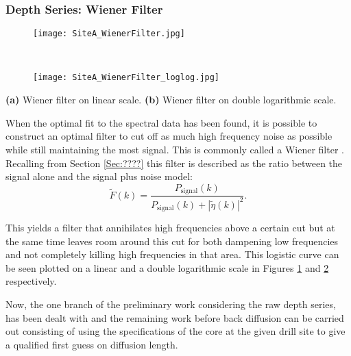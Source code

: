 \documentclass[../../CompleteThesis/Complete_1stDraft.tex]{subfiles}
\begin{document}
\subsubsection[Wiener Filter]{Depth Series: Wiener Filter}
\begin{marginfigure}
	\centering
	\begin{subfigure}{\marginparwidth}
		\centering
		\texttt{[image: SiteA\_WienerFilter.jpg]}
		\caption{\footnotesize}
		\label{fig:SiteA_WienerFilter}
	\end{subfigure}\\[1ex]
	
	\begin{subfigure}{\marginparwidth}
		\centering
		\texttt{[image: SiteA\_WienerFilter\_loglog.jpg]}
		\caption{\footnotesize}
		\label{fig:SiteA_WienerFilter_loglog}
	\end{subfigure}
	\caption[Wiener filter]{\footnotesize\textbf{(a)} Wiener filter on linear scale. \textbf{(b)} Wiener filter on double logarithmic scale.}
	\label{fig:SiteA_WienerFilters}
\end{marginfigure}
When the optimal fit to the spectral data has been found, it is possible to construct an optimal filter to cut off as much high frequency noise as possible while still maintaining the most signal. This is commonly called a Wiener filter . Recalling from Section \ref{Sec:????} this filter is described as the ratio between the signal alone and the signal plus noise model:
\begin{equation}
	\tilde{F}(k) = \frac{P_{\text{signal}}(k)}{P_{\text{signal}}(k) + |\tilde{\eta}(k)|^2}.
	\label{Eq:MethodWienerFilter}
\end{equation}

This yields a filter that annihilates high frequencies above a certain cut but at the same time leaves room around this cut for both dampening low frequencies and not completely killing high frequencies  in that area. 
This logistic curve can be seen plotted on a linear and a double logarithmic scale in Figures \ref{fig:SiteA_WienerFilter} and \ref{fig:SiteA_WienerFilter_loglog} respectively.

Now, the one branch of the preliminary work considering the raw depth series, has been dealt with and the remaining work before back diffusion can be carried out consisting of using the specifications of the core at the given drill site to give a qualified first guess on diffusion length.
\end{document}
